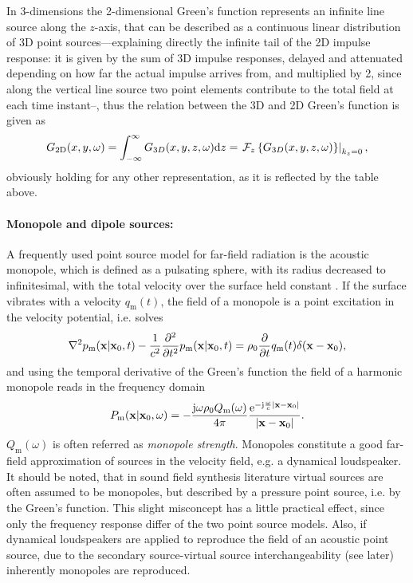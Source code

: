\vspace{3mm}
In 3-dimensions the 2-dimensional Green's function represents an infinite line source along the $z$-axis, that can be described as a continuous linear distribution of 3D point sources---explaining directly the infinite tail of the 2D impulse response: it is given by the sum of 3D impulse responses, delayed and attenuated depending on how far the actual impulse arrives from, and multiplied by 2, since along the vertical line source two point elements contribute to the total field at each time instant--, thus the relation between the 3D and 2D Green's function is given as
\begin{equation}
G_{2\mathrm{D}}(x,y,\omega) = \int_{-\infty}^{\infty} G_{3D}(x,y,z,\omega) \mathrm{d} z = \left. \mathcal{F}_{z}\left\{ G_{3D}(x,y,z,\omega) \right\}\right|_{k_z = 0},
\end{equation} 
obviously holding for any other representation, as it is reflected by the table above.

\paragraph{Monopole and dipole sources:\\} 
A frequently used point source model for far-field radiation is the acoustic monopole, which is defined as a pulsating sphere, with its radius decreased to infinitesimal, with the total velocity over the surface held constant \cite{Howe2007}. If the surface vibrates with a velocity $q_{\mathrm{m}}(t)$, the field of a monopole is a point excitation in the velocity potential, i.e. solves
\begin{equation}
\nabla^2 p_{\mathrm{m}}(\mathbf{x}|\mathbf{x}_0,t) - 	\frac{1}{c^2}\frac{\partial^2}{\partial t^2}p_{\mathrm{m}}(\mathbf{x}|\mathbf{x}_0,t) = \rho_0 \frac{\partial}{\partial t} q_{\mathrm{m}}(t)\delta(\mathbf{x}-\mathbf{x}_0),
\end{equation}
and using the temporal derivative of the Green's function the field of a harmonic monopole reads in the frequency domain
\begin{equation}
P_{\mathrm{m}}(\mathbf{x}|\mathbf{x}_0,\omega) = -\frac{\mathrm{j} \omega \rho_0 Q_{\mathrm{m}}(\omega)}{4\pi}\frac{\mathrm{e}^{-\mathrm{j} \frac{\omega}{c}|\mathbf{x}-\mathbf{x}_0|}}{|\mathbf{x}-\mathbf{x}_0|}.
\end{equation}
$Q_{\mathrm{m}}(\omega)$ is often referred as \emph{monopole strength}. Monopoles constitute a good far-field approximation of sources in the velocity field, e.g. a dynamical loudspeaker. It should be noted, that in sound field synthesis literature virtual sources are often assumed to be monopoles, but described by a pressure point source, i.e.  by the Green's function. This slight misconcept has a little practical effect, since only the frequency response differ of the two point source models. Also, if dynamical loudspeakers are applied to reproduce the field of an acoustic point source, due to the secondary source-virtual source interchangeability (see later) inherently monopoles are reproduced.

